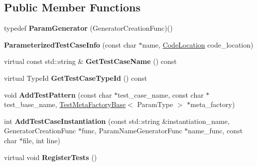 \subsection*{Public Member Functions}
\begin{DoxyCompactItemize}
\item 
\mbox{\label{classtesting_1_1internal_1_1_parameterized_test_case_info_a2f6a423f7ae8c7ac24b468538693aa26}} 
typedef {\bfseries Param\+Generator} (Generator\+Creation\+Func)()
\item 
\mbox{\label{classtesting_1_1internal_1_1_parameterized_test_case_info_a6d19f368428260bd5c6e608b4d3fc6af}} 
{\bfseries Parameterized\+Test\+Case\+Info} (const char $\ast$name, \mbox{\hyperlink{structtesting_1_1internal_1_1_code_location}{Code\+Location}} code\+\_\+location)
\item 
\mbox{\label{classtesting_1_1internal_1_1_parameterized_test_case_info_a8a9eafc7654b154165f131974397e200}} 
virtual const std\+::string \& {\bfseries Get\+Test\+Case\+Name} () const
\item 
\mbox{\label{classtesting_1_1internal_1_1_parameterized_test_case_info_a16ed77e95a6042c722d0029744acfc33}} 
virtual Type\+Id {\bfseries Get\+Test\+Case\+Type\+Id} () const
\item 
\mbox{\label{classtesting_1_1internal_1_1_parameterized_test_case_info_a3e557c888ec5e23b138c2ff254db15e5}} 
void {\bfseries Add\+Test\+Pattern} (const char $\ast$test\+\_\+case\+\_\+name, const char $\ast$test\+\_\+base\+\_\+name, \mbox{\hyperlink{classtesting_1_1internal_1_1_test_meta_factory_base}{Test\+Meta\+Factory\+Base}}$<$ Param\+Type $>$ $\ast$meta\+\_\+factory)
\item 
\mbox{\label{classtesting_1_1internal_1_1_parameterized_test_case_info_adefded091e3f20ac3a758029caea3eab}} 
int {\bfseries Add\+Test\+Case\+Instantiation} (const std\+::string \&instantiation\+\_\+name, Generator\+Creation\+Func $\ast$func, Param\+Name\+Generator\+Func $\ast$name\+\_\+func, const char $\ast$file, int line)
\item 
\mbox{\label{classtesting_1_1internal_1_1_parameterized_test_case_info_a7e118820b3074ce70c0440e2e49a50a1}} 
virtual void {\bfseries Register\+Tests} ()
\end{DoxyCompactItemize}
